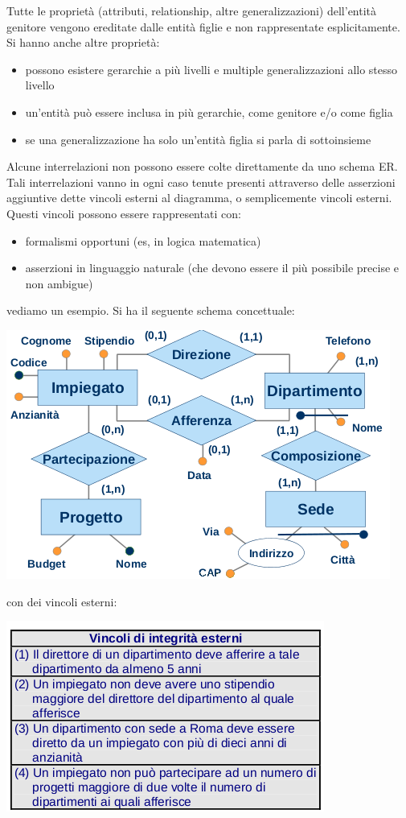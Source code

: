 \documentclass[a4paper,12pt, oneside]{book}
\begin{document}
Tutte le proprietà (attributi, relationship,
altre generalizzazioni) dell'entità genitore
vengono ereditate dalle entità figlie e non
rappresentate esplicitamente.\\
Si hanno anche altre proprietà:
\begin{itemize}
\item possono esistere gerarchie a più livelli e
multiple generalizzazioni allo stesso livello
\item un'entità può essere inclusa in più gerarchie,
come genitore e/o come figlia
\item se una generalizzazione ha solo un'entità figlia
si parla di sottoinsieme
\end{itemize}
Alcune interrelazioni non possono essere
colte direttamente da uno schema ER. Tali interrelazioni vanno in ogni caso tenute presenti
attraverso delle asserzioni aggiuntive dette vincoli
esterni al diagramma, o semplicemente vincoli
esterni. Questi vincoli possono essere rappresentati con:
\begin{itemize}
\item formalismi opportuni (es, in
logica matematica)
\item asserzioni in linguaggio
naturale (che devono essere il più possibile
precise e non ambigue)
\end{itemize}
vediamo un esempio. Si ha il seguente schema concettuale:
\begin{center}
\includegraphics[scale=2.5]{img/vin.png}
\end{center}
con dei vincoli esterni:
\begin{center}
\includegraphics[scale=0.7]{img/vin2.png}
\end{center}
\end{document}
